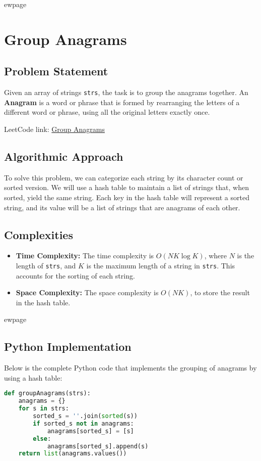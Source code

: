 
ewpage

\chapter{Group Anagrams}
\label{chap:Group_Anagrams}

\section*{Problem Statement}
Given an array of strings \texttt{strs}, the task is to group the anagrams together. An \textbf{Anagram} is a word or phrase that is formed by rearranging the letters of a different word or phrase, using all the original letters exactly once.

LeetCode link: \href{https://leetcode.com/problems/group-anagrams/}{Group Anagrams}

\section*{Algorithmic Approach}
To solve this problem, we can categorize each string by its character count or sorted version. We will use a hash table to maintain a list of strings that, when sorted, yield the same string. Each key in the hash table will represent a sorted string, and its value will be a list of strings that are anagrams of each other.

\section*{Complexities}
\begin{itemize}
	\item \textbf{Time Complexity:} The time complexity is \(O(NK \log K)\), where \(N\) is the length of \texttt{strs}, and \(K\) is the maximum length of a string in \texttt{strs}. This accounts for the sorting of each string.
	\item \textbf{Space Complexity:} The space complexity is \(O(NK)\), to store the result in the hash table.
\end{itemize}


ewpage %
\section*{Python Implementation}
Below is the complete Python code that implements the grouping of anagrams by using a hash table:

\begin{fullwidth}
\begin{lstlisting}[language=Python]
def groupAnagrams(strs):
    anagrams = {}
    for s in strs:
        sorted_s = ''.join(sorted(s))
        if sorted_s not in anagrams:
            anagrams[sorted_s] = [s]
        else:
            anagrams[sorted_s].append(s)
    return list(anagrams.values())
\end{lstlisting}

\end{fullwidth}

